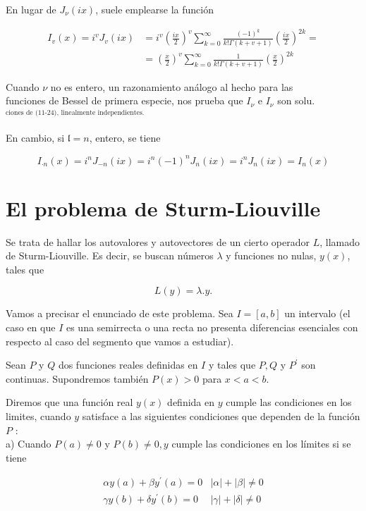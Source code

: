 \documentclass[10pt]{article}
\theoremstyle{plain}
\theoremstyle{definition}
\theoremstyle{remark}
\begin{document}
En lugar de $J_{\nu}(i x)$, suele emplearse la función

$$
\begin{aligned}
I_{v}(x)=i^{v} J_{v}(i x) & =i^{v}\left(\frac{i x}{2}\right)^{v} \sum_{k=0}^{\infty} \frac{(-1)^{k}}{k!\Gamma(k+v+1)}\left(\frac{i x}{2}\right)^{2 k}= \\
& =\left(\frac{x}{2}\right)^{v} \sum_{k=0}^{\infty} \frac{1}{k!\Gamma(k+v+1)}\left(\frac{x}{2}\right)^{2 k}
\end{aligned}
$$

Cuando $\nu$ no es entero, un razonamiento análogo al hecho para las\\
funciones de Bessel de primera especie, nos prueba que $I_{\nu}$ e $I_{\nu}$ son solu. ${ }^{\text {ciones de (11-24), linealmente independientes. }}$

En cambio, si $\mathfrak{l}=n$, entero, se tiene

$$
I_{\cdot n}(x)=i^{n} J_{-n}(i x)=i^{n}(-1)^{n} J_{n}(i x)=i^{n} J_{n}(i x)=I_{n}(x)
$$

\section{El problema de Sturm-Liouville}
Se trata de hallar los autovalores y autovectores de un cierto operador $L$, llamado de Sturm-Liouville. Es decir, se buscan números $\lambda$ y funciones no nulas, $y(x)$, tales que

$$
L(y)=\lambda . y .
$$

Vamos a precisar el enunciado de este problema. Sea $I=[a, b]$ un intervalo (el caso en que $I$ es una semirrecta o una recta no presenta diferencias esenciales con respecto al caso del segmento que vamos a estudiar).

Sean $P$ y $Q$ dos funciones reales definidas en $I$ y tales que $P, Q$ y $P^{\prime}$ son continuas. Supondremos también $P(x)>0$ para $x<a<b$.

Diremos que una función real $y(x)$ definida en $y$ cumple las condiciones en los limites, cuando $y$ satisface a las siguientes condiciones que dependen de la función $P$ :\\
a) Cuando $P(a) \neq 0$ y $P(b) \neq 0, y$ cumple las condiciones en los límites si se tiene

\[
\begin{array}{ll}
\alpha y(a)+\beta y^{\prime}(a)=0 & |\alpha|+|\beta| \neq 0 \\
\gamma y(b)+\delta y^{\prime}(b)=0 & |\gamma|+|\delta| \neq 0 \tag{12-2}
\end{array}
\]
\end{document}
